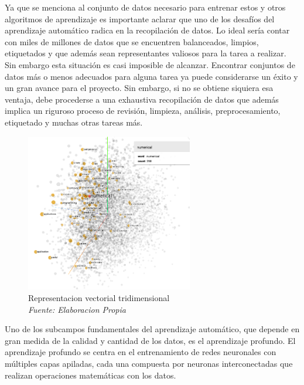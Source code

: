 Ya que se menciona al conjunto de datos necesario para entrenar estos y otros algoritmos de aprendizaje es importante aclarar que uno de los desafíos del aprendizaje automático radica en la recopilación de datos. Lo ideal sería contar con miles de millones de datos que se encuentren balanceados, limpios, etiquetados y que además sean representantes valiosos para la tarea a realizar. Sin embargo esta situación es casi imposible de alcanzar. Encontrar conjuntos de datos más o menos adecuados para alguna tarea ya puede considerarse un éxito y un gran avance para el proyecto. Sin embargo, si no se obtiene siquiera esa ventaja, debe procederse a una exhaustiva recopilación de datos que además implica un riguroso proceso de revisión, limpieza, análisis, preprocesamiento, etiquetado y muchas otras tareas más.

\begin{figure}[h!]
	\includegraphics[width=0.65\textwidth]{capitulo2/figuras/an1.png}
	\caption{Representacion vectorial tridimensional
		\\\textit{Fuente: Elaboracion Propia}}
	\label{fig:tensorboard}
\end{figure}

Uno de los subcampos fundamentales del aprendizaje automático, que depende en gran medida de la calidad y cantidad de los datos, es el aprendizaje profundo. El aprendizaje profundo se centra en el entrenamiento de redes neuronales con múltiples capas apiladas, cada una compuesta por neuronas interconectadas que realizan operaciones matemáticas con los datos.

